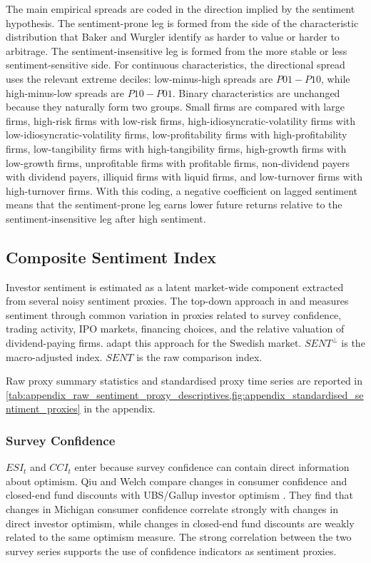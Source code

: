 \documentclass[11pt]{article}
\newcommand{\var}[1]{\ensuremath{#1}}
\begin{document}
The main empirical spreads are coded in the direction implied by the sentiment hypothesis. The sentiment-prone leg is formed from the side of the characteristic distribution that Baker and Wurgler identify as harder to value or harder to arbitrage. The sentiment-insensitive leg is formed from the more stable or less sentiment-sensitive side. For continuous characteristics, the directional spread uses the relevant extreme deciles: low-minus-high spreads are \var{P01-P10}, while high-minus-low spreads are \var{P10-P01}. Binary characteristics are unchanged because they naturally form two groups. Small firms are compared with large firms, high-risk firms with low-risk firms, high-idiosyncratic-volatility firms with low-idiosyncratic-volatility firms, low-profitability firms with high-profitability firms, low-tangibility firms with high-tangibility firms, high-growth firms with low-growth firms, unprofitable firms with profitable firms, non-dividend payers with dividend payers, illiquid firms with liquid firms, and low-turnover firms with high-turnover firms. With this coding, a negative coefficient on lagged sentiment means that the sentiment-prone leg earns lower future returns relative to the sentiment-insensitive leg after high sentiment.

\subsection{Composite Sentiment Index}
Investor sentiment is estimated as a latent market-wide component extracted from several noisy sentiment proxies. The top-down approach in \citet{baker2006sentiment} and \citet{baker2007} measures sentiment through common variation in proxies related to survey confidence, trading activity, IPO markets, financing choices, and the relative valuation of dividend-paying firms. \citet{zhang2023sweden} adapt this approach for the Swedish market. \var{SENT^{\perp}} is the macro-adjusted index. \var{SENT} is the raw comparison index.

Raw proxy summary statistics and standardised proxy time series are reported in \cref{tab:appendix_raw_sentiment_proxy_descriptives,fig:appendix_standardised_sentiment_proxies} in the appendix.

\subsubsection{Survey Confidence}
\var{ESI_t} and \var{CCI_t} enter because survey confidence can contain direct information about optimism. Qiu and Welch compare changes in consumer confidence and closed-end fund discounts with UBS/Gallup investor optimism \citep{qiu2006sentimentmeasures}. They find that changes in Michigan consumer confidence correlate strongly with changes in direct investor optimism, while changes in closed-end fund discounts are weakly related to the same optimism measure. The strong correlation between the two survey series supports the use of confidence indicators as sentiment proxies.
\end{document}
